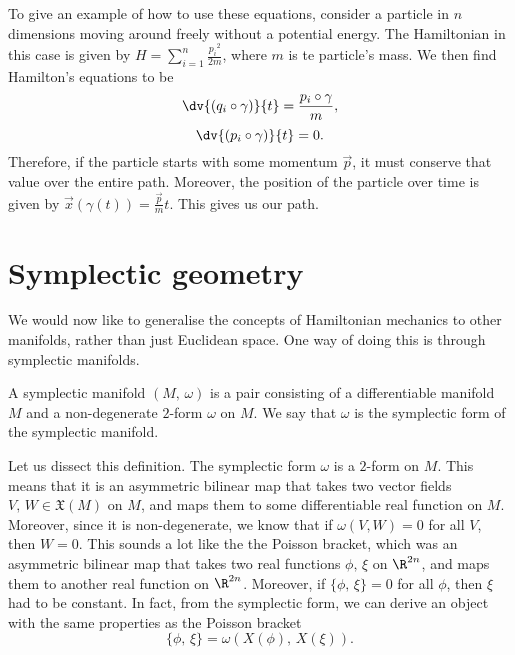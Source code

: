\documentclass{article}
\begin{document}
\begin{multicols}{2}
	To give an example of how to use these equations, consider a particle in \(n\) dimensions moving around freely without a potential energy.
	The Hamiltonian in this case is given by \(H = \sum_{i=1}^n\frac{{p_i}^2}{2m}\), where \(m\) is te particle's mass. We then find Hamilton's equations to be
	\begin{equation}
		\dv{(q_i\circ\gamma)}{t} = \frac{p_i\circ\gamma}{m},
	\end{equation}
	\begin{equation}
		\dv{(p_i\circ\gamma)}{t} = 0.
	\end{equation}
	Therefore, if the particle starts with some momentum \(\vec{p}\), it must conserve that value over the entire path.
	Moreover, the position of the particle over time is given by \(\vec{x}(\gamma(t)) = \frac{\vec{p}}{m}t\). This gives us our path.
	\section{Symplectic geometry}
	We would now like to generalise the concepts of Hamiltonian mechanics to other manifolds, rather than just Euclidean space. One way of doing this is through symplectic manifolds.
	\begin{definition}
		A symplectic manifold \((M,\,\omega)\) is a pair consisting of a differentiable manifold \(M\) and a non-degenerate \(2\)-form \(\omega\) on \(M\). We say that \(\omega\) is the symplectic form of the symplectic manifold.
	\end{definition}
	Let us dissect this definition. The symplectic form \(\omega\) is a \(2\)-form on \(M\). This means that it is an asymmetric bilinear map that takes two vector fields \(V,\,W\in\mathfrak{X}(M)\) on \(M\), and maps them to some differentiable real function on \(M\). Moreover, since it is non-degenerate, we know that if \(\omega(V,W) = 0\) for all \(V\), then \(W=0\).
	This sounds a lot like the the Poisson bracket, which was an asymmetric bilinear map that takes two real functions \(\phi,\,\xi\) on \(\R^{2n}\), and maps them to another real function on \(\R^{2n}\). Moreover, if \(\{\phi,\,\xi\}=0\) for all \(\phi\), then \(\xi\) had to be constant.
	In fact, from the symplectic form, we can derive an object with the same properties as the Poisson bracket
	\begin{equation}
		\{\phi,\,\xi\} = \omega(X(\phi),\,X(\xi)).

\end{equation}
\end{multicols}
\end{document}
